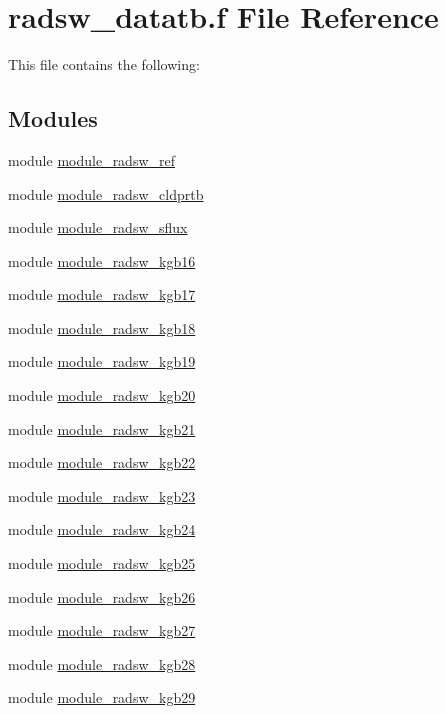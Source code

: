 \hypertarget{radsw__datatb_8f}{}\section{radsw\+\_\+datatb.\+f File Reference}
\label{radsw__datatb_8f}


This file contains the following\+:  


\subsection*{Modules}
\begin{DoxyCompactItemize}
\item 
module \hyperlink{namespacemodule__radsw__ref}{module\+\_\+radsw\+\_\+ref}
\item 
module \hyperlink{namespacemodule__radsw__cldprtb}{module\+\_\+radsw\+\_\+cldprtb}
\item 
module \hyperlink{namespacemodule__radsw__sflux}{module\+\_\+radsw\+\_\+sflux}
\item 
module \hyperlink{namespacemodule__radsw__kgb16}{module\+\_\+radsw\+\_\+kgb16}
\item 
module \hyperlink{namespacemodule__radsw__kgb17}{module\+\_\+radsw\+\_\+kgb17}
\item 
module \hyperlink{namespacemodule__radsw__kgb18}{module\+\_\+radsw\+\_\+kgb18}
\item 
module \hyperlink{namespacemodule__radsw__kgb19}{module\+\_\+radsw\+\_\+kgb19}
\item 
module \hyperlink{namespacemodule__radsw__kgb20}{module\+\_\+radsw\+\_\+kgb20}
\item 
module \hyperlink{namespacemodule__radsw__kgb21}{module\+\_\+radsw\+\_\+kgb21}
\item 
module \hyperlink{namespacemodule__radsw__kgb22}{module\+\_\+radsw\+\_\+kgb22}
\item 
module \hyperlink{namespacemodule__radsw__kgb23}{module\+\_\+radsw\+\_\+kgb23}
\item 
module \hyperlink{namespacemodule__radsw__kgb24}{module\+\_\+radsw\+\_\+kgb24}
\item 
module \hyperlink{namespacemodule__radsw__kgb25}{module\+\_\+radsw\+\_\+kgb25}
\item 
module \hyperlink{namespacemodule__radsw__kgb26}{module\+\_\+radsw\+\_\+kgb26}
\item 
module \hyperlink{namespacemodule__radsw__kgb27}{module\+\_\+radsw\+\_\+kgb27}
\item 
module \hyperlink{namespacemodule__radsw__kgb28}{module\+\_\+radsw\+\_\+kgb28}
\item 
module \hyperlink{namespacemodule__radsw__kgb29}{module\+\_\+radsw\+\_\+kgb29}
\end{DoxyCompactItemize}
